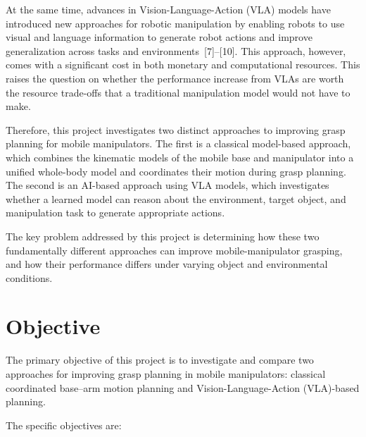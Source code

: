 \documentclass[12pt,a4paper]{article}
\begin{document}
At the same time, advances in Vision-Language-Action (VLA) models have introduced
new approaches for robotic manipulation by enabling robots to use visual and language
information to generate robot actions and improve generalization across tasks and
environments~[7]--[10]. This approach, however, comes with a significant cost in both monetary
and computational resources. This raises the question on whether the performance increase
from VLAs are worth the resource trade-offs that a traditional manipulation model would not
have to make.

\newpage 
Therefore, this project investigates two distinct approaches to improving grasp planning
for mobile manipulators. The first is a classical model-based approach, which combines the
kinematic models of the mobile base and manipulator into a unified whole-body model and
coordinates their motion during grasp planning. The second is an AI-based approach using VLA
models, which investigates whether a learned model can reason about the environment, target
object, and manipulation task to generate appropriate actions.

The key problem addressed by this project is determining how these two fundamentally
different approaches can improve mobile-manipulator grasping, and how their performance
differs under varying object and environmental conditions.

\section*{Objective}

The primary objective of this project is to investigate and compare two approaches for
improving grasp planning in mobile manipulators: classical coordinated base--arm motion
planning and Vision-Language-Action (VLA)-based planning.

The specific objectives are:
\end{document}
